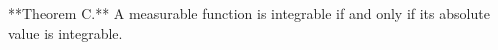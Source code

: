 **Theorem C.** A measurable function is integrable if and only if its absolute value is integrable.
